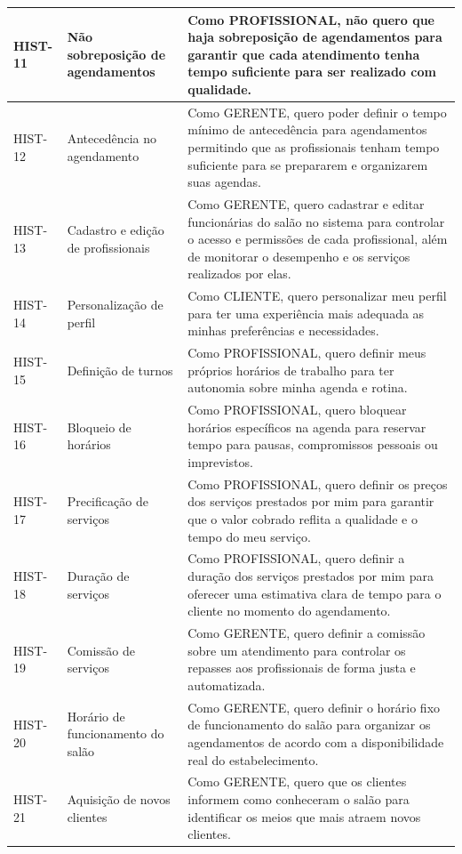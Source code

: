 \begin{longtable}{|p{2cm}|p{4cm}|p{9cm}|}
	HIST-11 & Não sobreposição de agendamentos & Como PROFISSIONAL, não quero que haja sobreposição de agendamentos para garantir que cada atendimento tenha tempo suficiente para ser realizado com qualidade. \\ \hline
	HIST-12 & Antecedência no agendamento & Como GERENTE, quero poder definir o tempo mínimo de antecedência para agendamentos permitindo que as profissionais tenham tempo suficiente para se prepararem e organizarem suas agendas. \\ \hline
	HIST-13 & Cadastro e edição de profissionais & Como GERENTE, quero cadastrar e editar funcionárias do salão no sistema para controlar o acesso e permissões de cada profissional, além de monitorar o desempenho e os serviços realizados por elas. \\ \hline
	HIST-14 & Personalização de perfil & Como CLIENTE, quero personalizar meu perfil para ter uma experiência mais adequada as minhas preferências e necessidades. \\ \hline
	HIST-15 & Definição de turnos & Como PROFISSIONAL, quero definir meus próprios horários de trabalho para ter autonomia sobre minha agenda e rotina. \\ \hline
	HIST-16 & Bloqueio de horários & Como PROFISSIONAL, quero bloquear horários específicos na agenda para reservar tempo para pausas, compromissos pessoais ou imprevistos. \\ \hline
	HIST-17 & Precificação de serviços & Como PROFISSIONAL, quero definir os preços dos serviços prestados por mim para garantir que o valor cobrado reflita a qualidade e o tempo do meu serviço. \\ \hline
	HIST-18 & Duração de serviços & Como PROFISSIONAL, quero definir a duração dos serviços prestados por mim para oferecer uma estimativa clara de tempo para o cliente no momento do agendamento. \\ \hline
	HIST-19 & Comissão de serviços & Como GERENTE, quero definir a comissão sobre um atendimento para controlar os repasses aos profissionais de forma justa e automatizada. \\ \hline
	HIST-20 & Horário de funcionamento do salão & Como GERENTE, quero definir o horário fixo de funcionamento do salão para organizar os agendamentos de acordo com a disponibilidade real do estabelecimento. \\ \hline
	HIST-21 & Aquisição de novos clientes & Como GERENTE, quero que os clientes informem como conheceram o salão para identificar os meios que mais atraem novos clientes. \\ \hline

\end{longtable}

